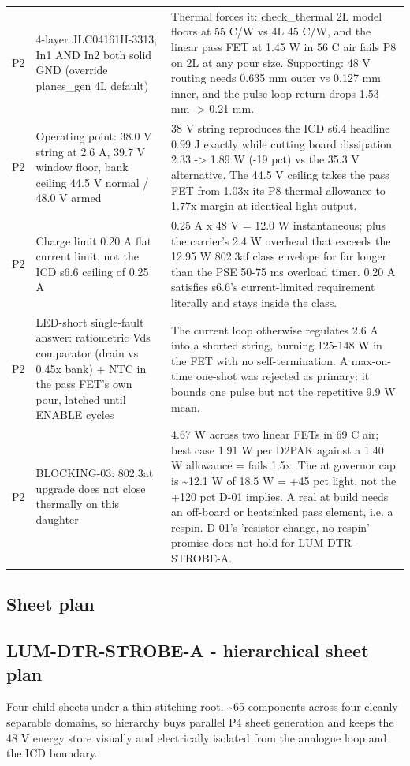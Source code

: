 \documentclass[11pt,a4paper]{article}
\begin{document}
{\begin{longtable}{lp{5.2cm}p{7.2cm}}
P2 & 4-layer JLC04161H-3313; In1 AND In2 both solid GND (override planes\_gen 4L default) & Thermal forces it: check\_thermal 2L model floors at 55 C/W vs 4L 45 C/W, and the linear pass FET at 1.45 W in 56 C air fails P8 on 2L at any pour size. Supporting: 48 V routing needs 0.635 mm outer vs 0.127 mm inner, and the pulse loop return drops 1.53 mm -\textgreater{} 0.21 mm. \\
P2 & Operating point: 38.0 V string at 2.6 A, 39.7 V window floor, bank ceiling 44.5 V normal / 48.0 V armed & 38 V string reproduces the ICD s6.4 headline 0.99 J exactly while cutting board dissipation 2.33 -\textgreater{} 1.89 W (-19 pct) vs the 35.3 V alternative. The 44.5 V ceiling takes the pass FET from 1.03x its P8 thermal allowance to 1.77x margin at identical light output. \\
P2 & Charge limit 0.20 A flat current limit, not the ICD s6.6 ceiling of 0.25 A & 0.25 A x 48 V = 12.0 W instantaneous; plus the carrier's 2.4 W overhead that exceeds the 12.95 W 802.3af class envelope for far longer than the PSE 50-75 ms overload timer. 0.20 A satisfies s6.6's current-limited requirement literally and stays inside the class. \\
P2 & LED-short single-fault answer: ratiometric Vds comparator (drain vs 0.45x bank) + NTC in the pass FET's own pour, latched until ENABLE cycles & The current loop otherwise regulates 2.6 A into a shorted string, burning 125-148 W in the FET with no self-termination. A max-on-time one-shot was rejected as primary: it bounds one pulse but not the repetitive 9.9 W mean. \\
P2 & BLOCKING-03: 802.3at upgrade does not close thermally on this daughter & 4.67 W across two linear FETs in 69 C air; best case 1.91 W per D2PAK against a 1.40 W allowance = fails 1.5x. The at governor cap is \textasciitilde{}12.1 W of 18.5 W = +45 pct light, not the +120 pct D-01 implies. A real at build needs an off-board or heatsinked pass element, i.e. a respin. D-01's 'resistor change, no respin' promise does not hold for LUM-DTR-STROBE-A. \\
\bottomrule
\end{longtable}
}
\subsection*{Sheet plan}
\subsection*{LUM-DTR-STROBE-A - hierarchical sheet plan}
Four child sheets under a thin stitching root. \textasciitilde{}65 components across four cleanly separable domains, so hierarchy buys parallel P4 sheet generation and keeps the 48 V energy store visually and electrically isolated from the analogue loop and the ICD boundary.
\end{document}
